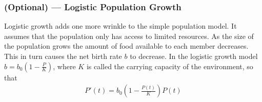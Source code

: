 %
%
%
%




\subsubsection*{(Optional) --- Logistic Population Growth}
Logistic growth adds one more wrinkle to the simple population model. It assumes that the
population only has access to limited resources. As the size of the population
grows the amount of food available to each member decreases. This in turn
causes the net birth rate $b$ to decrease. In the logistic growth model
$b=b_0\left(1-\tfrac{P}{K}\right)$, where $K$ is called the carrying capacity
of the environment,  so that
\begin{align*}
  P'(t) =b_0\left(1-\frac{P(t)}{K}\right)P(t)
\end{align*}


